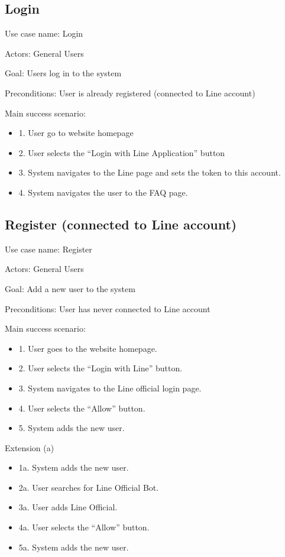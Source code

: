 \documentclass[12pt,oneside,openright,a4paper]{cpe-english-project}
\begin{document}
    \subsection{Login}
      \qquad Use case name: Login \par
      \qquad Actors: General Users \par
      \qquad Goal: Users log in to the system \par
      \qquad Preconditions: User is already registered (connected to Line account) \par
      \qquad Main success scenario:
      \begin{itemize}
        \item[] 1. User go to website homepage
        \item[] 2. User selects the “Login with Line Application” button
        \item[] 3. System navigates to the Line page and sets the token to this account.
        \item[] 4. System navigates the user to the FAQ page.
      \end{itemize}

      \subsection{Register (connected to Line account)}
        \qquad Use case name: Register \par
        \qquad Actors: General Users \par
        \qquad Goal: Add a new user to the system \par
        \qquad Preconditions: User has never connected to Line account \par
        \qquad Main success scenario:
        \begin{itemize}
          \item[] 1. User goes to the website homepage.
          \item[] 2. User selects the “Login with Line” button.
          \item[] 3. System navigates to the Line official login page.
          \item[] 4. User selects the “Allow” button.
          \item[] 5. System adds the new user.
        \end{itemize}
        \qquad Extension (a)
        \begin{itemize}
          \item[] 1a. System adds the new user.
          \item[] 2a. User searches for Line Official Bot.
          \item[] 3a. User adds Line Official.
          \item[] 4a. User selects the “Allow” button. 
          \item[] 5a. System adds the new user.
        \end{itemize}
      
\end{document}
